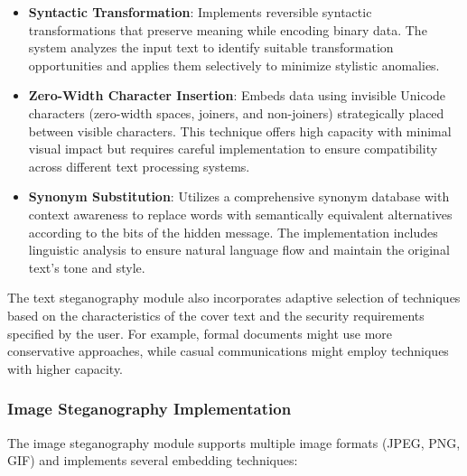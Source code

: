 \documentclass[12pt, a4paper, oneside]{book}
\begin{document}
\begin{itemize}[leftmargin=*]
    \item \textbf{Syntactic Transformation}: Implements reversible syntactic transformations that preserve meaning while encoding binary data. The system analyzes the input text to identify suitable transformation opportunities and applies them selectively to minimize stylistic anomalies.

    \item \textbf{Zero-Width Character Insertion}: Embeds data using invisible Unicode characters (zero-width spaces, joiners, and non-joiners) strategically placed between visible characters. This technique offers high capacity with minimal visual impact but requires careful implementation to ensure compatibility across different text processing systems.

    \item \textbf{Synonym Substitution}: Utilizes a comprehensive synonym database with context awareness to replace words with semantically equivalent alternatives according to the bits of the hidden message. The implementation includes linguistic analysis to ensure natural language flow and maintain the original text's tone and style.
\end{itemize}

The text steganography module also incorporates adaptive selection of techniques based on the characteristics of the cover text and the security requirements specified by the user. For example, formal documents might use more conservative approaches, while casual communications might employ techniques with higher capacity.

\subsubsection{Image Steganography Implementation}
The image steganography module supports multiple image formats (JPEG, PNG, GIF) and implements several embedding techniques:
\end{document}

